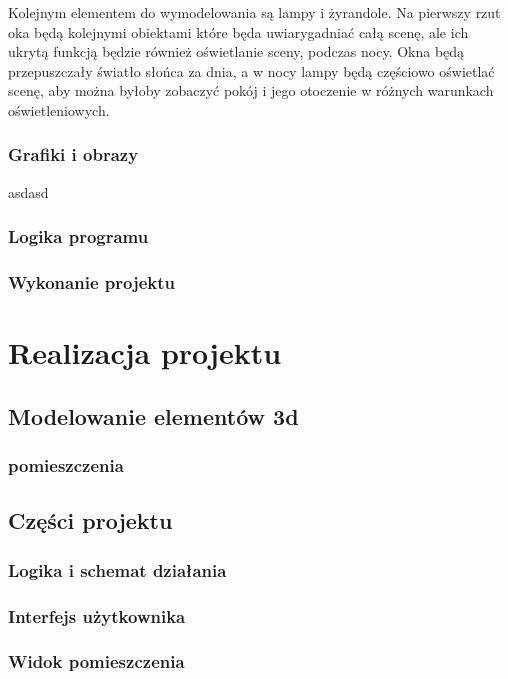 \documentclass{article} %
\begin{document}
            Kolejnym elementem do wymodelowania są lampy i żyrandole. Na pierwszy rzut oka będą kolejnymi obiektami które będa uwiarygadniać całą scenę, ale ich ukrytą funkcją będzie również oświetlanie sceny, podczas nocy. Okna będą przepuszczały światło słońca za dnia, a w nocy lampy będą częściowo oświetlać scenę, aby można byłoby zobaczyć pokój i jego otoczenie w różnych warunkach oświetleniowych.
            \\
            
        \subsubsection{Grafiki i obrazy}
            asdasd
            \\
                
        
        \subsubsection{Logika programu}
        
        \subsubsection{Wykonanie projektu}
    
        
\section{Realizacja projektu}
    \subsection{Modelowanie elementów 3d}
        \subsubsection{pomieszczenia}
    \subsection{Części projektu}
        \subsubsection{Logika i schemat działania}
        \subsubsection{Interfejs użytkownika}
        \subsubsection{Widok pomieszczenia}
\end{document}
